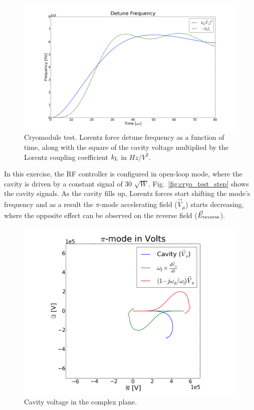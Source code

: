 \documentclass[a4paper,12pt]{article}
\begin{document}
\begin{figure}
\centering
\includegraphics[scale=0.25]{../figures/cryo_test_freqs.png}
\caption{Cryomodule test. Lorentz force detune frequency as a function of time, along with the square of the cavity voltage multiplied by the Lorentz coupling coefficient $k_{\rm L}$ in $Hz/V^2$.}
\label{fig:cryo_test_freqs}
\end{figure}

In this exercise, the RF controller is configured in open-loop mode, where the cavity is driven by a constant signal of 30 $\sqrt{W}$. Fig.~\ref{fig:cryo_test_step} shows the cavity signals. As the cavity fills up, Lorentz forces start shifting the mode's frequency and as a result the $\pi$-mode accelerating field ($\vec V_{\mu}$) starts decreasing, where the opposite effect can be observed on the reverse field ($\vec E_{\rm reverse}$).

\begin{figure}
\centering
\includegraphics[scale=0.30]{../figures/cryo_test_pi_volts.png}
\caption{Cavity voltage in the complex plane.}
\label{fig:cryo_test_pi_volts}
\end{figure}
\end{document}
